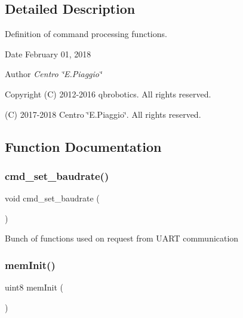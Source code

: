 \subsection{Detailed Description}
Definition of command processing functions. 

\begin{DoxyDate}{Date}
February 01, 2018 
\end{DoxyDate}
\begin{DoxyAuthor}{Author}
{\itshape Centro \char`\"{}\+E.\+Piaggio\char`\"{}} 
\end{DoxyAuthor}
\begin{DoxyCopyright}{Copyright}
(C) 2012-\/2016 qbrobotics. All rights reserved. 

(C) 2017-\/2018 Centro \char`\"{}\+E.\+Piaggio\char`\"{}. All rights reserved. 
\end{DoxyCopyright}


\subsection{Function Documentation}
\mbox{\label{command__processing_8h_aa86bf1f2fa69ab5927f7e4e40eb40581}} 
\subsubsection{cmd\+\_\+set\+\_\+baudrate()}
{\footnotesize\ttfamily void cmd\+\_\+set\+\_\+baudrate (\begin{DoxyParamCaption}{ }\end{DoxyParamCaption})}

Bunch of functions used on request from U\+A\+RT communication \mbox{\label{command__processing_8h_afe52941f8bc21271e811fb0d9f265f38}} 
\subsubsection{mem\+Init()}
{\footnotesize\ttfamily uint8 mem\+Init (\begin{DoxyParamCaption}{ }\end{DoxyParamCaption})}

